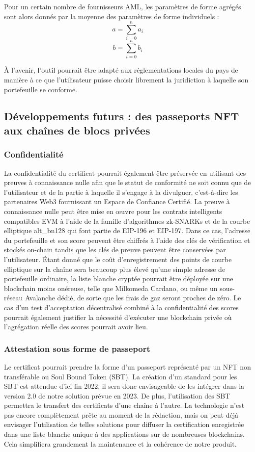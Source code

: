 ﻿\documentclass[a4paper]{article}
\begin{document}
Pour un certain nombre de fournisseurs AML, les paramètres de forme agrégés sont alors donnés par la moyenne des paramètres de forme individuels :
$$a=\sum_{i=0}^na_i$$
$$b=\sum_{i=0}^nb_i$$  

À l'avenir, l'outil pourrait être adapté aux réglementations locales du pays de manière à ce que l'utilisateur puisse choisir librement la juridiction à laquelle son portefeuille se conforme.

\subsection{Développements futurs : des passeports NFT aux chaînes de blocs privées}
\subsubsection{Confidentialité}
La confidentialité du certificat pourrait également être préservée en utilisant des preuves à connaissance nulle afin que le statut de conformité ne soit connu que de l'utilisateur et de la partie à laquelle il s'engage à la divulguer, c'est-à-dire les partenaires Web3 fournissant un Espace de Confiance Certifié. La preuve à connaissance nulle peut être mise en œuvre pour les contrats intelligents compatibles EVM à l'aide de la famille d'algorithmes zk-SNARKs et de la courbe elliptique alt\_bn128 qui font partie de EIP-196 et EIP-197. Dans ce cas, l'adresse du portefeuille et son score peuvent être chiffrés à l’aide des clés de vérification et stockés on-chain tandis que les clés de preuve peuvent être conservées par l'utilisateur.
Étant donné que le coût d'enregistrement des points de courbe elliptique sur la chaîne sera beaucoup plus élevé qu'une simple adresse de portefeuille ordinaire, la liste blanche cryptée pourrait être déployée sur une blockchain moins onéreuse, telle que Milkomeda Cardano, ou même un sous-réseau Avalanche dédié, de sorte que les frais de gaz seront proches de zéro.
Le cas d'un test d'acceptation décentralisé combiné à la confidentialité des scores pourrait également justifier la nécessité d'exécuter une blockchain privée où l'agrégation réelle des scores pourrait avoir lieu.

\subsubsection{Attestation sous forme de passeport}
Le certificat pourrait prendre la forme d'un passeport représenté par un NFT non transférable ou Soul Bound Token (SBT). La création d'un standard pour les SBT est attendue d’ici fin 2022, il sera donc envisageable de les intégrer dans la version 2.0 de notre solution prévue en 2023.
De plus, l’utilisation des SBT permettra le transfert des certificats d'une chaîne à l'autre. La technologie n'est pas encore complètement prête au moment de la rédaction, mais on peut déjà envisager l'utilisation de telles solutions pour diffuser la certification enregistrée dans une liste blanche unique à des applications sur de nombreuses blockchains. Cela simplifiera grandement la maintenance et la cohérence de notre produit.
\end{document}

